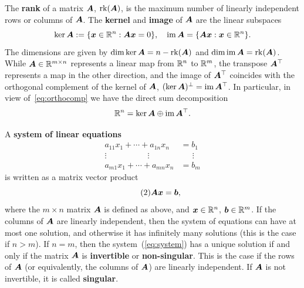 \documentclass[11pt,a4paper]{memoir}
\begin{document}
The \strictpagecheck{}\textbf{rank} of a matrix $\bm{A}$, $\mathrm{rk}(\bm{A})$, is the maximum number of linearly independent rows or columns of $\bm{A}$. The \textbf{kernel} and \textbf{image} of $\bm{A}$ are the linear subspaces
\begin{equation*}
 \ker \bm{A} := \{\bm{x}\in \mathbb{R}^n \mathrel{\mathop{:}} \bm{A}\bm{x}=0\}, \quad \operatorname{im} \bm{A} = \{\bm{A}\bm{x} \mathrel{\mathop{:}} \bm{x}\in \mathbb{R}^n\}.
\end{equation*}
The dimensions are given by $\dim \ker{\bm{A}} = n-\mathrm{rk}(\bm{A})$ and $\dim \operatorname{im} \bm{A} = \mathrm{rk}(\bm{A})$. While $\bm{A}\in \mathbb{R}^{m\times n}$ represents a linear map from $\mathbb{R}^n$ to $\mathbb{R}^m$, the transpose $\bm{A}^{\top}$ represents a map in the other direction, and the image of $\bm{A}^{\top}$ coincides with the orthogonal complement of the kernel of $\bm{A}$, $(\ker \bm{A})^{\perp} = \operatorname{im} \bm{A}^{\top}$. In particular, in view of~\eqref{eq:orthocomp} we have the direct sum decomposition
\begin{equation*}
 \mathbb{R}^n = \ker \bm{A} \oplus \operatorname{im} \bm{A}^{\top}.
\end{equation*}

A \textbf{system of linear equations}
\begin{align*}
  a_{11} x_1 + \cdots +a_{1n}x_n &= b_1\\
   \vdots \quad\quad\quad\quad\quad \vdots \quad \ \  & \quad \ \ \vdots\\
  a_{m1} x_1 + \cdots +a_{mn}x_n &= b_m
\end{align*}
is written as a matrix vector product
\begin{equation}\label{eq:system}\tag{2}
  \bm{A}\bm{x} = \bm{b},
\end{equation}
where the $m\times n$ matrix $\bm{A}$ is defined as above, and 
$\bm{x}\in \mathbb{R}^n$, $\bm{b}\in \mathbb{R}^m$. If the columns of $\bm{A}$ are linearly independent, then the system of equations can have at most one solution, and otherwise it has infinitely many solutions (this is the case if $n>m$).
If $n=m$, then the system~(\ref{eq:system}) has a unique solution
if and only if the matrix $\bm{A}$ is \textbf{invertible} or \textbf{non-singular}. This is the case if the rows of $\bm{A}$ (or equivalently, the columns of $\bm{A}$) are linearly independent.
If $\bm{A}$ is not invertible, it is called \textbf{singular}.
\end{document}
